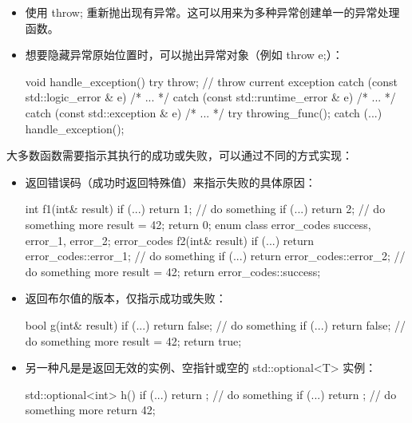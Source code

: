 \begin{itemize}
\item
使用 throw; 重新抛出现有异常。这可以用来为多种异常创建单一的异常处理函数。

\item
想要隐藏异常原始位置时，可以抛出异常对象（例如 throw e;）：

\begin{cpp}
void handle_exception()
{
    try
    {
        throw; // throw current exception
    }
    catch (const std::logic_error & e)
    { /* ... */ }
    catch (const std::runtime_error & e)
    { /* ... */ }
    catch (const std::exception & e)
    { /* ... */ }
}
try
{
    throwing_func();
}
catch (...)
{
    handle_exception();
}
\end{cpp}
\end{itemize}


大多数函数需要指示其执行的成功或失败，可以通过不同的方式实现：

\begin{itemize}
\item
返回错误码（成功时返回特殊值）来指示失败的具体原因：

\begin{cpp}
int f1(int& result)
{
    if (...) return 1;
    // do something
    if (...) return 2;
    // do something more
    result = 42;
    return 0;
}
enum class error_codes {success, error_1, error_2};
error_codes f2(int& result)
{
    if (...) return error_codes::error_1;
    // do something
    if (...) return error_codes::error_2;
    // do something more
    result = 42;
    return error_codes::success;
}
\end{cpp}

\item
返回布尔值的版本，仅指示成功或失败：

\begin{cpp}
bool g(int& result)
{
    if (...) return false;
    // do something
    if (...) return false;
    // do something more
    result = 42;
    return true;
}
\end{cpp}

\item
另一种凡是是返回无效的实例、空指针或空的 std::optional<T> 实例：

\begin{cpp}
std::optional<int> h()
{
    if (...) return {};
    // do something
    if (...) return {};
    // do something more
    return 42;
}
\end{cpp}
\end{itemize}


